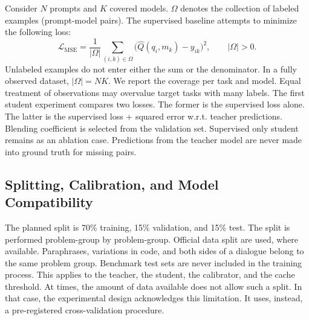 \documentclass{FastFyp}
\begin{document}
Consider $N$ prompts and $K$ covered models.
$\Omega$ denotes the collection of labeled examples (prompt-model pairs).
The supervised baseline attempts to minimize the following loss:
\begin{equation}
\mathcal L_{\mathrm{MSE}}=
\frac{1}{|\Omega|}\sum_{(i,k)\in\Omega}
\bigl(\hat Q(q_i,m_k)-y_{ik}\bigr)^2,
\qquad |\Omega|>0.
\label{eq:quality-loss}
\end{equation}
Unlabeled examples do not enter either the sum or the denominator.
In a fully observed dataset, $|\Omega|=NK$.
We report the coverage per task and model.
Equal treatment of observations may overvalue target tasks with many labels.
The first student experiment compares two losses.
The former is the supervised loss alone.
The latter is the supervised loss + squared error w.r.t. teacher predictions.
Blending coefficient is selected from the validation set.
Supervised only student remains as an ablation case.
Predictions from the teacher model are never made into ground truth for missing pairs.

\subsection{Splitting, Calibration, and Model Compatibility}
The planned split is 70\% training, 15\% validation, and 15\% test.
The split is performed problem-group by problem-group.
Official data split are used, where available.
Paraphrases, variations in code, and both sides of a dialogue belong to the same problem group.
Benchmark test sets are never included in the training process.
This applies to the teacher, the student, the calibrator, and the cache threshold.
At times, the amount of data available does not allow such a split.
In that case, the experimental design acknowledges this limitation.
It uses, instead, a pre-registered cross-validation procedure.
\end{document}
